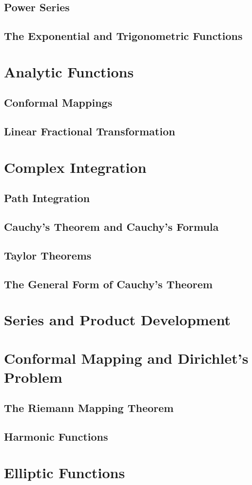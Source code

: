 \subsection{Power Series}

\subsection{The Exponential and Trigonometric Functions}

\section{Analytic Functions}

\subsection{Conformal Mappings}

\subsection{Linear Fractional Transformation}

\section{Complex Integration}

\subsection{Path Integration}

\subsection{Cauchy's Theorem and Cauchy's Formula}

\subsection{Taylor Theorems}

\subsection{The General Form of Cauchy's Theorem}

\section{Series and Product Development}

\section{Conformal Mapping and Dirichlet's Problem}

\subsection{The Riemann Mapping Theorem}

\subsection{Harmonic Functions}

\section{Elliptic Functions}


